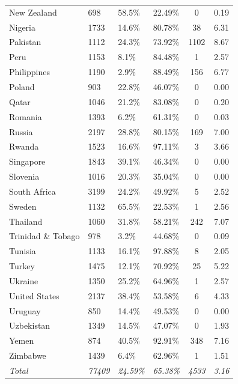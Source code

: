 \begin{longtable}[h!]{lC{1.6cm}C{1.6cm}C{1.6cm}cc}
New Zealand         & 698  & 58.5\% & 22.49\% & 0    & 0.19 \\
Nigeria             & 1733 & 14.6\% & 80.78\% & 38   & 6.31 \\
Pakistan            & 1112 & 24.3\% & 73.92\% & 1102 & 8.67 \\
Peru                & 1153 & 8.1\%  & 84.48\% & 1    & 2.57 \\
Philippines         & 1190 & 2.9\%  & 88.49\% & 156  & 6.77 \\
Poland              & 903  & 22.8\% & 46.07\% & 0    & 0.00 \\
Qatar               & 1046 & 21.2\% & 83.08\% & 0    & 0.20 \\
Romania             & 1393 & 6.2\%  & 61.31\% & 0    & 0.03 \\
Russia              & 2197 & 28.8\% & 80.15\% & 169  & 7.00 \\
Rwanda              & 1523 & 16.6\% & 97.11\% & 3    & 3.66 \\
Singapore           & 1843 & 39.1\% & 46.34\% & 0    & 0.00 \\
Slovenia            & 1016 & 20.3\% & 35.04\% & 0    & 0.00 \\
South Africa        & 3199 & 24.2\% & 49.92\% & 5    & 2.52 \\
Sweden              & 1132 & 65.5\% & 22.53\% & 1    & 2.56 \\
Thailand            & 1060 & 31.8\% & 58.21\% & 242  & 7.07 \\
Trinidad \& Tobago  & 978  & 3.2\%  & 44.68\% & 0    & 0.09 \\
Tunisia             & 1133 & 16.1\% & 97.88\% & 8    & 2.05 \\
Turkey              & 1475 & 12.1\% & 70.92\% & 25   & 5.22 \\
Ukraine             & 1350 & 25.2\% & 64.96\% & 1    & 2.57 \\
United States       & 2137 & 38.4\% & 53.58\% & 6    & 4.33 \\
Uruguay             & 850  & 14.4\% & 49.53\% & 0    & 0.00 \\
Uzbekistan          & 1349 & 14.5\% & 47.07\% & 0    & 1.93 \\
Yemen               & 874  & 40.5\% & 92.91\% & 348  & 7.16 \\
Zimbabwe            & 1439 & 6.4\%  & 62.96\% & 1    & 1.51 \\
\textit{Total} &
  \textit{77409} &
  \textit{24.59\%} &
  \textit{65.38\%} &
  \textit{4533} &
  \textit{3.16} \\ \hline
\end{longtable}
\endgroup

